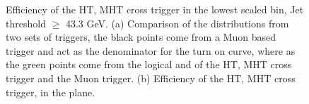 \begin{figure}[h!]
    \centering
     \caption{Efficiency of the HT, MHT cross trigger in the lowest
       scaled bin, Jet \PT threshold $\geq $ 43.$\dot{3}$ GeV.  (a)
       Comparison of the \alt distributions from two sets of triggers,
       the black points come from a Muon based trigger and act as the
       denominator for the turn on curve, where as the green points
       come from the logical and of the HT, MHT cross trigger and the
       Muon trigger. (b) Efficiency of the HT, MHT cross trigger, in
       the \alt plane.}
\end{figure}


